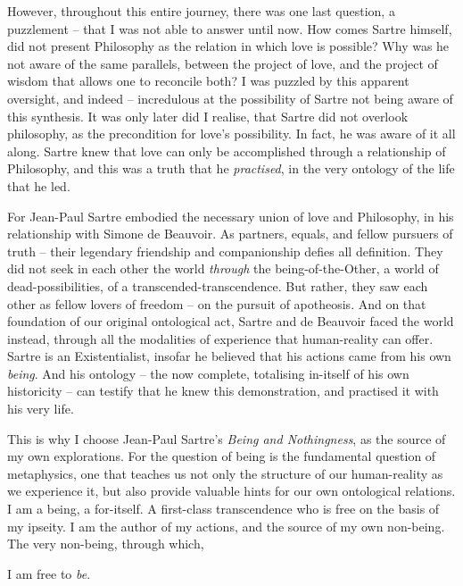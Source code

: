 However, throughout this entire journey, there was one last question, a puzzlement -- that I was not able to answer until now. How comes Sartre himself, did not present Philosophy as the relation in which love is possible? Why was he not aware of the same parallels, between the project of love, and the project of wisdom that allows one to reconcile both? I was puzzled by this apparent oversight, and indeed -- incredulous at the possibility of Sartre not being aware of this synthesis. It was only later did I realise, that Sartre did not overlook philosophy, as the precondition for love's possibility. In fact, he was aware of it all along. Sartre knew that love can only be accomplished through a relationship of Philosophy, and this was a truth that he \emph{practised}, in the very ontology of the life that he led.

For Jean-Paul Sartre embodied the necessary union of love and Philosophy, in his relationship with Simone de Beauvoir. As partners, equals, and fellow pursuers of truth -- their legendary friendship and companionship defies all definition. They did not seek in each other the world \emph{through} the being-of-the-Other, a world of dead-possibilities, of a transcended-transcendence. But rather, they saw each other as fellow lovers of freedom -- on the pursuit of apotheosis. And on that foundation of our original ontological act, Sartre and de Beauvoir faced the world instead, through all the modalities of experience that human-reality can offer. Sartre is an Existentialist, insofar he believed that his actions came from his own \emph{being}. And his ontology -- the now complete, totalising in-itself of his own historicity -- can testify that he knew this demonstration, and practised it with his very life.

This is why I choose Jean-Paul Sartre's \emph{Being and Nothingness}, as the source of my own explorations. For the question of being is the fundamental question of metaphysics, one that teaches us not only the structure of our human-reality as we experience it, but also provide valuable hints for our own ontological relations. I am a being, a for-itself. A first-class transcendence who is free on the basis of my ipseity. I am the author of my actions, and the source of my own non-being. The very non-being, through which, 

\noindent
I am free to \emph{be}.